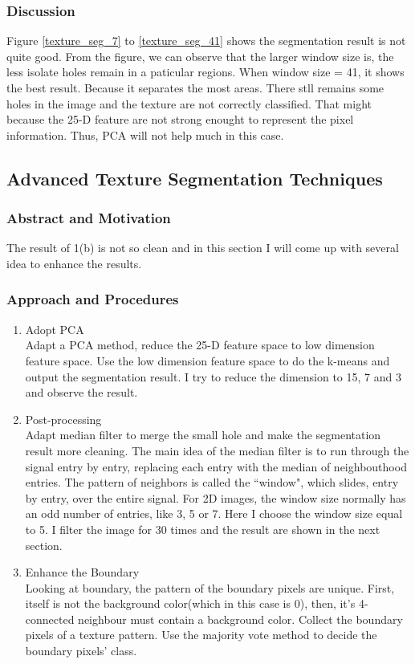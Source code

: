\documentclass[11pt]{article}
\begin{document}
\subsubsection{Discussion}

Figure \ref{texture_seg_7} to \ref{texture_seg_41} shows the segmentation result is not quite good. From the figure, we can observe that the larger window size is, the less isolate holes remain in a paticular regions. When window size = 41, it shows the best result. Because it separates the most areas. There stll remains some holes in the image and the texture are not correctly classified. That might because the 25-D feature are not strong enought to represent the pixel information. Thus, PCA will not help much in this case.


\subsection{Advanced Texture Segmentation Techniques}
\subsubsection{Abstract and Motivation}
The result of 1(b) is not so clean and in this section I will come up with several idea to enhance the results.
\subsubsection{Approach and Procedures}
\begin{enumerate}
\item Adopt PCA \\
Adapt a PCA method, reduce the 25-D feature space to low dimension feature space. Use the low dimension feature space to do the k-means and output the segmentation result. I try to reduce the dimension to 15, 7 and 3 and observe the result.
\item Post-processing \\
Adapt median filter to merge the small hole and make the segmentation result more cleaning.  The main idea of the median filter is to run through the signal entry by entry, replacing each entry with the median of neighbouthood entries. The pattern of neighbors is called the ``window", which slides, entry by entry, over the entire signal. For 2D images, the window size normally has an odd number of entries, like 3, 5 or 7. Here I choose the window size equal to 5. I filter the image for 30 times and the result are shown in the next section. 
\item Enhance the Boundary \\

Looking at boundary, the pattern of the boundary pixels are unique. First, itself is not the background color(which in this case is 0), then, it's 4-connected neighbour must contain a background color. Collect the boundary pixels of a texture pattern. Use the majority vote method to decide the boundary pixels' class.

\end{enumerate} 
\end{document}
